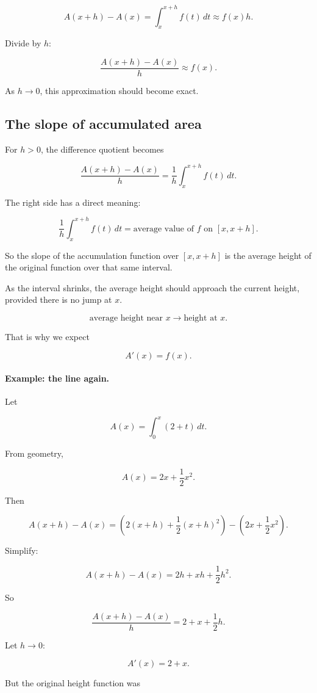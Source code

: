 \[
A(x+h)-A(x)
=
\int_x^{x+h} f(t)\,dt
\approx
f(x)h.
\]

Divide by \(h\):

\[
\frac{A(x+h)-A(x)}{h}
\approx
f(x).
\]

As \(h\to0\), this approximation should become exact.

\subsection{The slope of accumulated area}
\label{subsec:slope-accumulated-area}

For \(h>0\), the difference quotient becomes

\[
\frac{A(x+h)-A(x)}{h}
=
\frac1h\int_x^{x+h} f(t)\,dt.
\]

The right side has a direct meaning:

\[
\boxed{
\frac1h\int_x^{x+h} f(t)\,dt
=
\text{average value of \(f\) on }[x,x+h].
}
\]

So the slope of the accumulation function over \([x,x+h]\) is the average height of the
original function over that same interval.

As the interval shrinks, the average height should approach the current height, provided
there is no jump at \(x\).

\[
\text{average height near \(x\)}
\longrightarrow
\text{height at \(x\)}.
\]

That is why we expect

\[
A'(x)=f(x).
\]

\paragraph{Example: the line again.}
Let

\[
A(x)=\int_0^x (2+t)\,dt.
\]

From geometry,

\[
A(x)=2x+\frac12x^2.
\]

Then

\[
A(x+h)-A(x)
=
\left(2(x+h)+\frac12(x+h)^2\right)
-
\left(2x+\frac12x^2\right).
\]

Simplify:

\[
A(x+h)-A(x)
=
2h+xh+\frac12h^2.
\]

So

\[
\frac{A(x+h)-A(x)}{h}
=
2+x+\frac12h.
\]

Let \(h\to0\):

\[
A'(x)=2+x.
\]

But the original height function was

